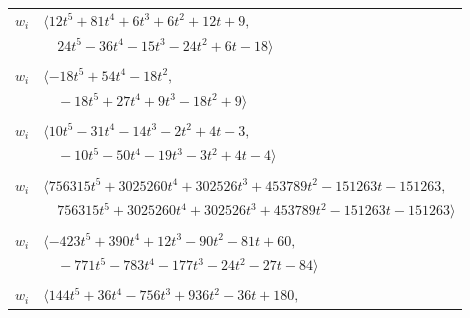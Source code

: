 \documentclass[11pt]{article}
\begin{document}
\begin{longtable}{@{}ll@{}}
$w_i$ & $\langle 12t^{5}+81t^{4}+6t^{3}+6t^{2}+12t+9,$\\
 & $\quad 24t^{5}-36t^{4}-15t^{3}-24t^{2}+6t-18\rangle$\\
\addlinespace[2pt]
\multicolumn{2}{@{}p{0.97\textwidth}@{}}{$i=39$, $D_i=18$, $\rho_{ij}$: $28{:}1, \allowbreak 29{:}2, \allowbreak 45{:}1, \allowbreak 48{:}2, \allowbreak 49{:}2, \allowbreak 64{:}2$}\\
$w_i$ & $\langle -18t^{5}+54t^{4}-18t^{2},$\\
 & $\quad -18t^{5}+27t^{4}+9t^{3}-18t^{2}+9\rangle$\\
\addlinespace[2pt]
\multicolumn{2}{@{}p{0.97\textwidth}@{}}{$i=40$, $D_i=4$, $\rho_{ij}$: $1{:}1, \allowbreak 8{:}2, \allowbreak 17{:}2, \allowbreak 24{:}2, \allowbreak 30{:}2, \allowbreak 58{:}1, \allowbreak 63{:}2, \allowbreak 64{:}2, \allowbreak 65{:}2$}\\
$w_i$ & $\langle 10t^{5}-31t^{4}-14t^{3}-2t^{2}+4t-3,$\\
 & $\quad -10t^{5}-50t^{4}-19t^{3}-3t^{2}+4t-4\rangle$\\
\addlinespace[2pt]
\multicolumn{2}{@{}p{0.97\textwidth}@{}}{$i=41$, $D_i=605052$, $\rho_{ij}$: $1{:}2, \allowbreak 2{:}2, \allowbreak 3{:}1, \allowbreak 29{:}2, \allowbreak 31{:}1, \allowbreak 37{:}2, \allowbreak 43{:}1, \allowbreak 49{:}1, \allowbreak 56{:}2, \allowbreak 69{:}1, \allowbreak 71{:}1$}\\
$w_i$ & $\langle 756315t^{5}+3025260t^{4}+302526t^{3}+453789t^{2}-151263t-151263,$\\
 & $\quad 756315t^{5}+3025260t^{4}+302526t^{3}+453789t^{2}-151263t-151263\rangle$\\
\addlinespace[2pt]
\multicolumn{2}{@{}p{0.97\textwidth}@{}}{$i=42$, $D_i=4$, $\rho_{ij}$: $2{:}2, \allowbreak 4{:}1, \allowbreak 14{:}2, \allowbreak 15{:}2, \allowbreak 27{:}2, \allowbreak 47{:}1, \allowbreak 48{:}2, \allowbreak 51{:}1, \allowbreak 59{:}2, \allowbreak 64{:}2$}\\
$w_i$ & $\langle -423t^{5}+390t^{4}+12t^{3}-90t^{2}-81t+60,$\\
 & $\quad -771t^{5}-783t^{4}-177t^{3}-24t^{2}-27t-84\rangle$\\
\addlinespace[2pt]
\multicolumn{2}{@{}p{0.97\textwidth}@{}}{$i=43$, $D_i=36$, $\rho_{ij}$: $0{:}1, \allowbreak 5{:}1, \allowbreak 7{:}2, \allowbreak 8{:}1, \allowbreak 17{:}2, \allowbreak 20{:}2, \allowbreak 23{:}1, \allowbreak 25{:}2, \allowbreak 41{:}2, \allowbreak 46{:}2, \allowbreak 61{:}2, \allowbreak 68{:}1$}\\
$w_i$ & $\langle 144t^{5}+36t^{4}-756t^{3}+936t^{2}-36t+180,$\\

\end{longtable}
\end{document}
